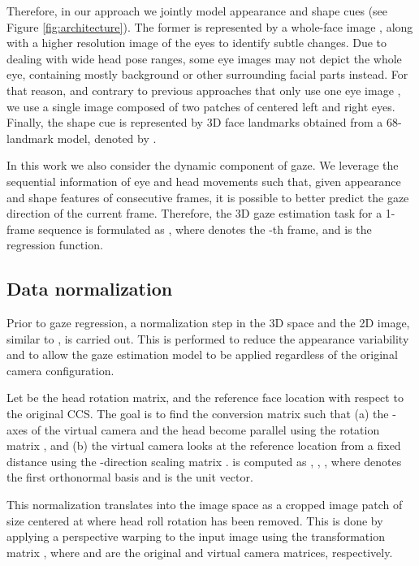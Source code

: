 \documentclass{bmvc2k}
\begin{document}
Therefore, in our approach we jointly model appearance and shape cues (see Figure \ref{fig:architecture}). The former is represented by a whole-face image , along with a higher resolution image of the eyes  to identify subtle changes. Due to dealing with wide head pose ranges, some eye images may not depict the whole eye, containing mostly background or other surrounding facial parts instead. For that reason, and contrary to previous approaches that only use one eye image \cite{zhang2015appearance, sugano2014learning}, we use a single image composed of two patches of centered left and right eyes. Finally, the shape cue is represented by 3D face landmarks obtained from a 68-landmark model, denoted by .

In this work we also consider the dynamic component of gaze. We leverage the sequential information of eye and head movements such that, given appearance and shape features of consecutive frames, it is possible to better predict the gaze direction of the current frame. Therefore, the 3D gaze estimation task for a 1-frame sequence is formulated as , where  denotes the -th frame, and  is the regression function.

\subsection{Data normalization}
\label{sec:normalization}

Prior to gaze regression, a normalization step in the 3D space and the 2D image, similar to \cite{sugano2014learning}, is carried out. This is performed to reduce the appearance variability and to allow the gaze estimation model to be applied regardless of the original camera configuration.

Let  be the head rotation matrix, and   the reference face location with respect to the original CCS. The goal is to find the conversion matrix   such that (a) the -axes of the virtual camera and the head become parallel using the rotation matrix , and (b) the virtual camera looks at the reference location from a fixed distance  using the -direction scaling matrix .  is computed as , , , where  denotes the first orthonormal basis and  is the unit vector. 

This normalization translates into the image space as a cropped image patch of size  centered at  where head roll rotation has been removed. This is done by applying a perspective warping to the input image  using the transformation matrix , where  and  are the original and virtual camera matrices, respectively.
\end{document}
